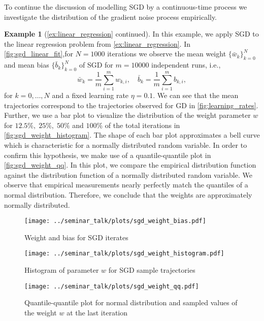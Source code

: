\documentclass[12pt]{article}
\theoremstyle{definition}
\newtheorem{example}[example]{Example}
\numberwithin{equation}{section}
\begin{document}
To continue the discussion of modelling SGD by a continuous-time process we investigate the distribution of the gradient noise process empirically.
\begin{example}[\autoref{ex:linear_regression} continued]
  \label{ex:sgd}
  In this example, we apply SGD to the linear regression problem from \autoref{ex:linear_regression}. In \autoref{fig:sgd_linear_fit},for $N = 1000$ iterations we observe the mean weight $\{\bar{w}_k\}_{k=0}^{N}$ and mean bias $\{\bar{b}_k\}_{k=0}^{N}$ of SGD for $m=10000$ independent runs, i.e.,
  \begin{equation*}
    \bar{w}_k = \frac{1}{m}\sum_{i=1}^m w_{k,i}, \quad \bar{b}_k = \frac{1}{m}\sum_{i=1}^mb_{k,i},
  \end{equation*}
  for $k = 0, \dots, N$ and a fixed learning rate $\eta = 0.1$. We can see that the mean trajectories correspond to the trajectories observed for GD in \autoref{fig:learning_rates}.
  Further, we use a bar plot to visualize the distribution of the weight parameter $w$ for $12.5\%,\; 25\%,\; 50\%$ and $100\%$ of the total iterations in \autoref{fig:sgd_weight_histogram}. The shape of each bar plot approximates a bell curve which is characteristic for a normally distributed random variable. In order to confirm this hypothesis, we make use of a quantile-quantile plot in \autoref{fig:sgd_weight_qq}.
  In this plot, we compare the empirical distribution function against the distribution function of a normally distributed random variable. We observe that empirical measurements nearly perfectly match the quantiles of a normal distribution. Therefore, we conclude that the weights are approximately normally distributed.
  \begin{figure}[htb]
    \centering
    \texttt{[image: ../seminar\_talk/plots/sgd\_weight\_bias.pdf]}
    \caption{Weight and bias for SGD iterates}
    \label{fig:sgd_linear_fit}
  \end{figure}
  \begin{figure}[htb]
    \centering
    \texttt{[image: ../seminar\_talk/plots/sgd\_weight\_histogram.pdf]}
    \caption{Histogram of parameter $w$ for SGD sample trajectories}
    \label{fig:sgd_weight_histogram}
  \end{figure}
  \begin{figure}[htb]
    \centering
    \texttt{[image: ../seminar\_talk/plots/sgd\_weight\_qq.pdf]}
    \caption{Quantile-quantile plot for normal distribution and sampled values of the weight $w$ at the last iteration}
    \label{fig:sgd_weight_qq}
  \end{figure}
\end{example}
\end{document}
